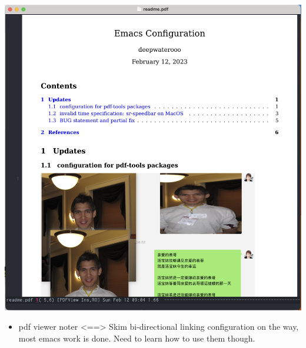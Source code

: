 \documentclass[9pt, b5paper]{article}
\begin{document}
\begin{center}
\includegraphics[width=.9\linewidth]{./pic/mememe2.png}
\end{center}
\begin{itemize}
\item pdf viewer noter <==> Skim bi-directional linking configuration on the way, most emacs work is done. Need to learn how to use them though.
\end{itemize}
\end{document}
